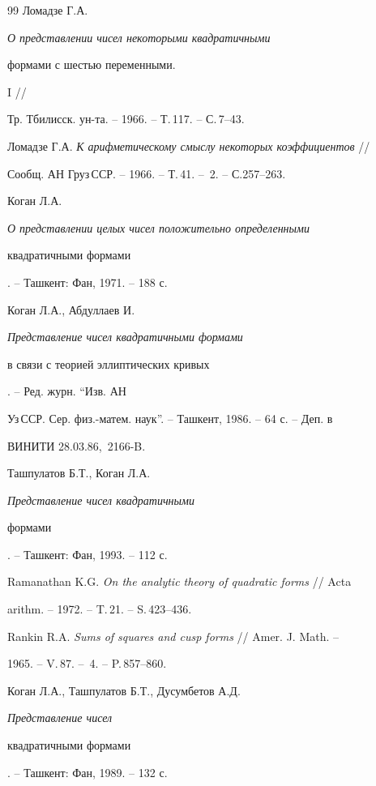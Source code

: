 \begin{thebibliography}{99}
Ломадзе Г.А. {\em О представлении чисел некоторыми квадратичными


формами с шестью переменными.} I //


Тр. Тбилисск. ун-та. -- 1966. -- Т.\,117. -- С.\,7--43.




Ломадзе Г.А. {\em К арифметическому смыслу некоторых коэффициентов} //


Сообщ. АН Груз\,ССР. -- 1966. -- Т.\,41. -- \No\,2. -- С.257--263.




Коган Л.А. {\em О представлении целых чисел положительно определенными


квадратичными формами}. -- Ташкент: Фан, 1971. -- 188 с.




Коган Л.А., Абдуллаев И. {\em Представление чисел квадратичными формами


в связи с теорией эллиптических кривых}. -- Ред. журн. ``Изв. АН


Уз\,ССР. Сер. физ.-матем. наук''. -- Ташкент, 1986. -- 64 с. -- Деп. в


ВИНИТИ 28.03.86, \No\,2166-B.




Ташпулатов Б.Т., Коган Л.А. {\em Представление чисел квадратичными


формами}. -- Ташкент: Фан, 1993. -- 112 с.




Ramanathan K.G. {\em On the analytic theory of quadratic forms} // Acta


arithm. -- 1972. -- T.\,21. -- S.\,423--436.




Rankin R.A. {\em Sums of squares and cusp forms} // Amer. J. Math. --


1965. -- V.\,87. -- \No\,4. -- P.\,857--860.




Коган Л.А., Ташпулатов Б.Т., Дусумбетов А.Д. {\em Представление чисел


квадратичными формами}. -- Ташкент: Фан, 1989. -- 132 с.





\end{thebibliography}





\vskip 2cm












\label{end}





